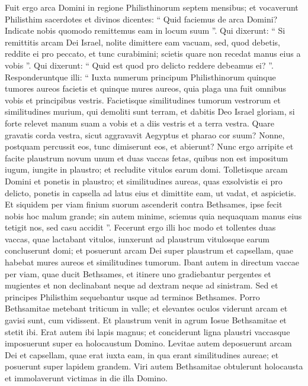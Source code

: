 \begin{biblechapter}
\begin{biblechapter}
\begin{biblechapter}
\begin{biblechapter}
\begin{biblechapter}
\begin{biblechapter}
\verse Fuit ergo arca Domini in regione Philisthinorum septem mensibus; 
\verse et vocaverunt Philisthim sacerdotes et divinos dicentes: “ Quid faciemus de arca Domini? Indicate nobis quomodo remittemus eam in locum suum ”.
 Qui dixerunt: 
\verse “ Si remittitis arcam Dei Israel, nolite dimittere eam vacuam, sed, quod debetis, reddite ei pro peccato, et tunc curabimini; scietis quare non recedat manus eius a vobis ”. 
\verse Qui dixerunt: “ Quid est quod pro delicto reddere debeamus ei? ”. Responderuntque illi: 
\verse “ Iuxta numerum principum Philisthinorum quinque tumores aureos facietis et quinque mures aureos, quia plaga una fuit omnibus vobis et principibus vestris. Facietisque similitudines tumorum vestrorum et similitudines murium, qui demoliti sunt terram, et dabitis Deo Israel gloriam, si forte relevet manum suam a vobis et a diis vestris et a terra vestra. 
\verse Quare gravatis corda vestra, sicut aggravavit Aegyptus et pharao cor suum? Nonne, postquam percussit eos, tunc dimiserunt eos, et abierunt? 
\verse Nunc ergo arripite et facite plaustrum novum unum et duas vaccas fetas, quibus non est impositum iugum, iungite in plaustro; et recludite vitulos earum domi. 
\verse Tolletisque arcam Domini et ponetis in plaustro; et similitudines aureas, quas exsolvistis ei pro delicto, ponetis in capsella ad latus eius et dimittite eam, ut vadat, 
\verse et aspicietis. Et siquidem per viam finium suorum ascenderit contra Bethsames, ipse fecit nobis hoc malum grande; sin autem minime, sciemus quia nequaquam manus eius tetigit nos, sed casu accidit ”.
 \verse Fecerunt ergo illi hoc modo et tollentes duas vaccas, quae lactabant vitulos, iunxerunt ad plaustrum vitulosque earum concluserunt domi; 
\verse et posuerunt arcam Dei super plaustrum et capsellam, quae habebat mures aureos et similitudines tumorum.
 \verse Ibant autem in directum vaccae per viam, quae ducit Bethsames, et itinere uno gradiebantur pergentes et mugientes et non declinabant neque ad dextram neque ad sinistram. Sed et principes Philisthim sequebantur usque ad terminos Bethsames. 
\verse Porro Bethsamitae metebant triticum in valle; et elevantes oculos viderunt arcam et gavisi sunt, cum vidissent.
 \verse Et plaustrum venit in agrum Iosue Bethsamitae et stetit ibi. Erat autem ibi lapis magnus; et conciderunt ligna plaustri vaccasque imposuerunt super ea holocaustum Domino. 
\verse Levitae autem deposuerunt arcam Dei et capsellam, quae erat iuxta eam, in qua erant similitudines aureae; et posuerunt super lapidem grandem. Viri autem Bethsamitae obtulerunt holocausta et immolaverunt victimas in die illa Domino. 

\end{biblechapter}
\end{biblechapter}
\end{biblechapter}
\end{biblechapter}
\end{biblechapter}
\end{biblechapter}
